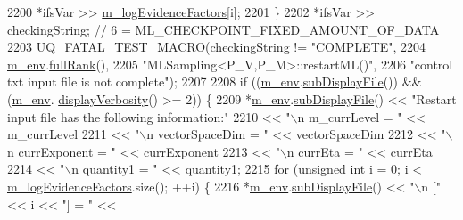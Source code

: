 \begin{DoxyCode}
2200       *ifsVar >> \hyperlink{class_q_u_e_s_o_1_1_m_l_sampling_a75f2ceab4a2c6774b3fa07d74221dbf3}{m\_logEvidenceFactors}[i];
2201     \}
2202     *ifsVar >> checkingString; \textcolor{comment}{// 6 = ML\_CHECKPOINT\_FIXED\_AMOUNT\_OF\_DATA}
2203     \hyperlink{_defines_8h_a56d63d18d0a6d45757de47fcc06f574d}{UQ\_FATAL\_TEST\_MACRO}(checkingString != \textcolor{stringliteral}{"COMPLETE"},
2204                         \hyperlink{class_q_u_e_s_o_1_1_m_l_sampling_a13f1ca4fe9f94822fe572a743eaced1d}{m\_env}.\hyperlink{class_q_u_e_s_o_1_1_base_environment_a84a239e42ae443cf71db6e03e8159620}{fullRank}(),
2205                         \textcolor{stringliteral}{"MLSampling<P\_V,P\_M>::restartML()"},
2206                         \textcolor{stringliteral}{"control txt input file is not complete"});
2207 
2208     \textcolor{keywordflow}{if} ((\hyperlink{class_q_u_e_s_o_1_1_m_l_sampling_a13f1ca4fe9f94822fe572a743eaced1d}{m\_env}.\hyperlink{class_q_u_e_s_o_1_1_base_environment_a8a0064746ae8dddfece4229b9ad374d6}{subDisplayFile}()) && (\hyperlink{class_q_u_e_s_o_1_1_m_l_sampling_a13f1ca4fe9f94822fe572a743eaced1d}{m\_env}.
      \hyperlink{class_q_u_e_s_o_1_1_base_environment_a1fe5f244fc0316a0ab3e37463f108b96}{displayVerbosity}() >= 2)) \{
2209       *\hyperlink{class_q_u_e_s_o_1_1_m_l_sampling_a13f1ca4fe9f94822fe572a743eaced1d}{m\_env}.\hyperlink{class_q_u_e_s_o_1_1_base_environment_a8a0064746ae8dddfece4229b9ad374d6}{subDisplayFile}() << \textcolor{stringliteral}{"Restart input file has the following information:"}
2210                               << \textcolor{stringliteral}{"\(\backslash\)n m\_currLevel = "}      << m\_currLevel
2211                               << \textcolor{stringliteral}{"\(\backslash\)n vectorSpaceDim = "}   << vectorSpaceDim
2212                               << \textcolor{stringliteral}{"\(\backslash\)n currExponent = "}     << currExponent
2213                               << \textcolor{stringliteral}{"\(\backslash\)n currEta = "}          << currEta
2214                               << \textcolor{stringliteral}{"\(\backslash\)n quantity1 = "}        << quantity1;
2215       \textcolor{keywordflow}{for} (\textcolor{keywordtype}{unsigned} \textcolor{keywordtype}{int} i = 0; i < \hyperlink{class_q_u_e_s_o_1_1_m_l_sampling_a75f2ceab4a2c6774b3fa07d74221dbf3}{m\_logEvidenceFactors}.size(); ++i) \{
2216         *\hyperlink{class_q_u_e_s_o_1_1_m_l_sampling_a13f1ca4fe9f94822fe572a743eaced1d}{m\_env}.\hyperlink{class_q_u_e_s_o_1_1_base_environment_a8a0064746ae8dddfece4229b9ad374d6}{subDisplayFile}() << \textcolor{stringliteral}{"\(\backslash\)n ["} << i << \textcolor{stringliteral}{"] = "} << 

\end{DoxyCode}

